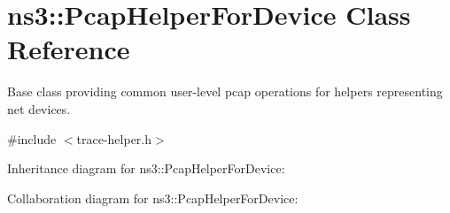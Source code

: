 \hypertarget{classns3_1_1PcapHelperForDevice}{}\section{ns3\+:\+:Pcap\+Helper\+For\+Device Class Reference}
\label{classns3_1_1PcapHelperForDevice}


Base class providing common user-\/level pcap operations for helpers representing net devices.  




{\ttfamily \#include $<$trace-\/helper.\+h$>$}



Inheritance diagram for ns3\+:\+:Pcap\+Helper\+For\+Device\+:


Collaboration diagram for ns3\+:\+:Pcap\+Helper\+For\+Device\+:
